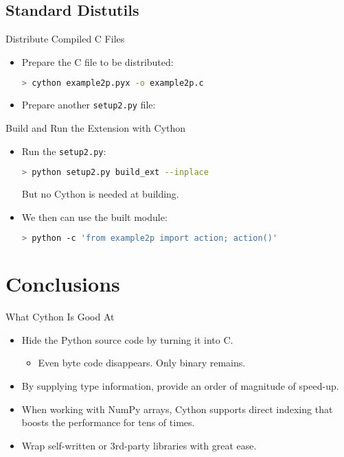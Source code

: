 \documentclass[dvips,xcolor=pst,14pt]{beamer}
\begin{document}
\subsection{
Standard Distutils
}

\begin{frame}[fragile]{
%
Distribute Compiled C Files
%
}
\begin{itemize}
\item Prepare the C file to be distributed:
\begin{lstlisting}[language=bash]
> cython example2p.pyx -o example2p.c
\end{lstlisting}
\item Prepare another \verb+setup2.py+ file:

\end{itemize}
\end{frame}

\begin{frame}[fragile]{
%
Build and Run the Extension with Cython
%
}
\begin{itemize}
\item Run the \verb+setup2.py+:
\begin{lstlisting}[language=bash]
> python setup2.py build_ext --inplace
\end{lstlisting}
\alert{But no Cython is needed at building.}
\item We then can use the built module:
\begin{lstlisting}[language=bash]
> python -c 'from example2p import action; action()'
\end{lstlisting}
\end{itemize}
\end{frame}

\section*{
Conclusions
}

\begin{frame}{
%
What Cython Is Good At
%
}
\begin{itemize}
\item Hide the Python source code by turning it into C.
\begin{itemize}
  \item Even byte code disappears.  Only binary remains.
\end{itemize}
\item By supplying type information, provide an order of magnitude of speed-up.
\item When working with NumPy arrays, Cython supports direct indexing that
boosts the performance for tens of times.
\item Wrap self-written or 3rd-party libraries with great ease.
\end{itemize}
\end{frame}
\end{document}
